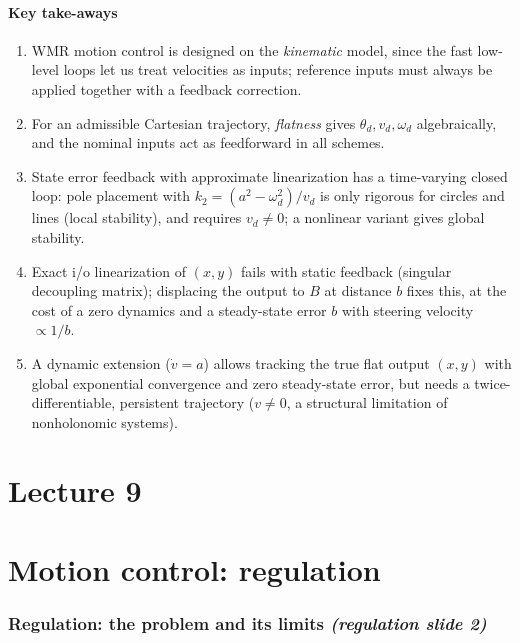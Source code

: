 \documentclass[11pt,a4paper]{article}
\newcommand{\vd}{v_d}
\newcommand{\omd}{\omega_d}
\theoremstyle{definition}
\theoremstyle{plain}
\theoremstyle{remark}
\begin{document}
\subsection*{Key take-aways}
\begin{enumerate}
\item WMR motion control is designed on the \emph{kinematic} model, since the fast low-level loops let us treat velocities as inputs; reference inputs must always be applied together with a feedback correction.
\item For an admissible Cartesian trajectory, \emph{flatness} gives $\theta_d,\vd,\omd$ algebraically, and the nominal inputs act as feedforward in all schemes.
\item State error feedback with approximate linearization has a time-varying closed loop: pole placement with $k_2=(a^2-\omd^2)/\vd$ is only rigorous for circles and lines (local stability), and requires $\vd\neq0$; a nonlinear variant gives global stability.
\item Exact i/o linearization of $(x,y)$ fails with static feedback (singular decoupling matrix); displacing the output to $B$ at distance $b$ fixes this, at the cost of a zero dynamics and a steady-state error $b$ with steering velocity $\propto1/b$.
\item A dynamic extension ($\dot v=a$) allows tracking the true flat output $(x,y)$ with global exponential convergence and zero steady-state error, but needs a twice-differentiable, persistent trajectory ($v\neq0$, a structural limitation of nonholonomic systems).
\end{enumerate}

\newpage

\setcounter{section}{0}
\renewcommand{\thesection}{\arabic{section}}
\part{Lecture 9}

\part{Motion control: regulation}

\section{Regulation: the problem and its limits \emph{(regulation slide 2)}}
\end{document}
